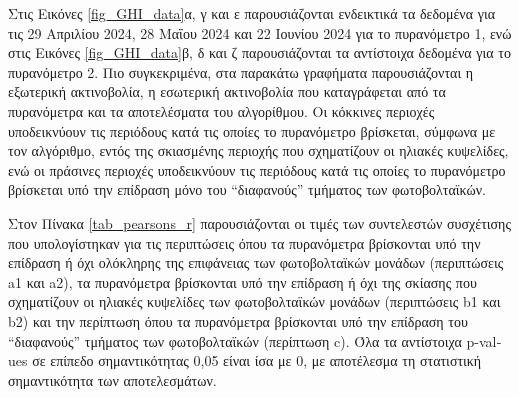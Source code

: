 \documentclass[12pt, a4paper]{report} %
\newcommand{\english}{\foreignlanguage{english}}
\begin{document}
Στις Εικόνες \ref{fig_GHI_data}α, γ και ε παρουσιάζονται ενδεικτικά τα δεδομένα για τις 29 Απριλίου 2024, 28 Μαΐου 2024 και 22 
Ιουνίου 2024 για το πυρανόμετρο 1, ενώ στις Εικόνες \ref{fig_GHI_data}β, δ και ζ παρουσιάζονται τα αντίστοιχα δεδομένα για το 
πυρανόμετρο 2. Πιο συγκεκριμένα, στα παρακάτω γραφήματα παρουσιάζονται η εξωτερική ακτινοβολία, η εσωτερική ακτινοβολία που 
καταγράφεται από τα πυρανόμετρα και τα αποτελέσματα του αλγορίθμου. Οι κόκκινες περιοχές υποδεικνύουν τις περιόδους κατά 
τις οποίες το πυρανόμετρο βρίσκεται, σύμφωνα με τον αλγόριθμο, εντός της σκιασμένης περιοχής που σχηματίζουν οι ηλιακές 
κυψελίδες, ενώ οι πράσινες περιοχές υποδεικνύουν τις περιόδους κατά τις οποίες το πυρανόμετρο βρίσκεται υπό την επίδραση 
μόνο του “διαφανούς” τμήματος των φωτοβολταϊκών.

Στον Πίνακα \ref{tab_pearsons_r} παρουσιάζονται οι τιμές των συντελεστών συσχέτισης που υπολογίστηκαν για τις περιπτώσεις όπου τα 
πυρανόμετρα βρίσκονται υπό την επίδραση ή όχι ολόκληρης της επιφάνειας των φωτοβολταϊκών μονάδων (περιπτώσεις \english{a1} 
και \english{a2}), τα πυρανόμετρα βρίσκονται υπό την επίδραση ή όχι της σκίασης που σχηματίζουν οι ηλιακές κυψελίδες των 
φωτοβολταϊκών μονάδων (περιπτώσεις \english{b1} και \english{b2}) και την περίπτωση όπου τα πυρανόμετρα βρίσκονται υπό την 
επίδραση του “διαφανούς” τμήματος των φωτοβολταϊκών (περίπτωση \english{c}). Όλα τα αντίστοιχα \english{p-values} σε επίπεδο 
σημαντικότητας 0,05 είναι ίσα με 0, με αποτέλεσμα τη στατιστική σημαντικότητα των αποτελεσμάτων.

\end{document}
